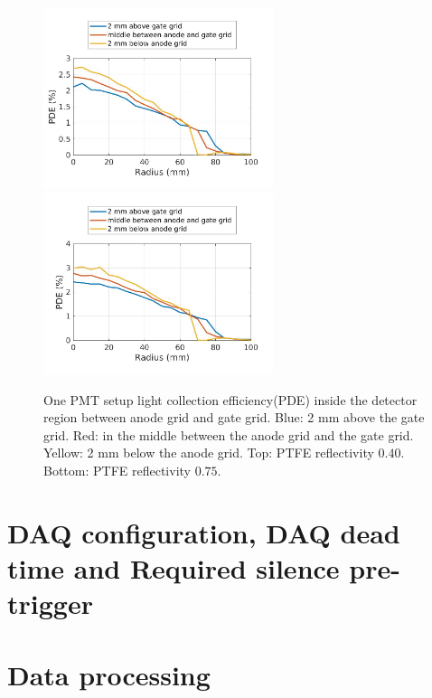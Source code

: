 \begin{figure}[!ht]
  \centering
  \includegraphics[width=0.6\textwidth,clip,trim={0 0 0 170}]
  {Figures/Ch10/OnePMTPDEvsRadiusPTFE040.jpg}
  \includegraphics[width=0.6\textwidth,clip,trim={0 0 0 170}]
  {Figures/Ch10/OnePMTPDEvsRadiusPTFE075.jpg}
  \caption{One PMT setup light collection efficiency(PDE) inside the detector region between anode grid and gate grid. Blue: 2 mm above the gate grid. Red: in the middle between the anode grid and the gate grid. Yellow: 2 mm below the anode grid. Top: PTFE reflectivity $0.40$. Bottom: PTFE reflectivity $0.75$. }
  \label{fig: light collection r 040 one PMT}
\end{figure}



\section{DAQ configuration, DAQ dead time and Required silence pre-trigger}




\section{Data processing}




